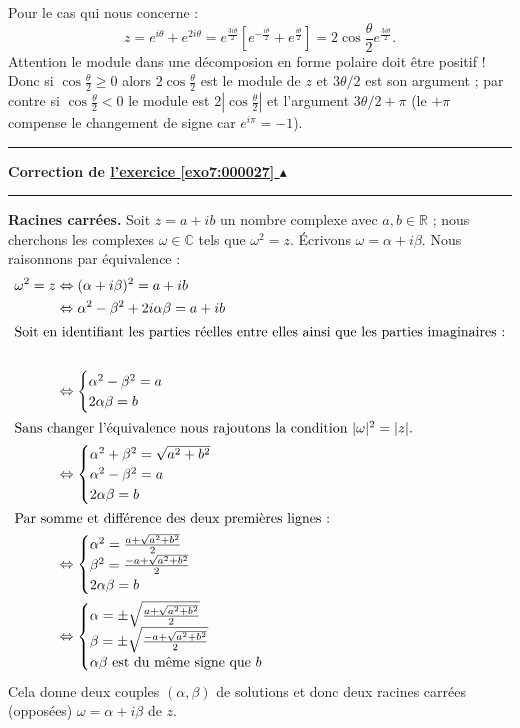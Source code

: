 \documentclass[11pt,a4paper]{article}
\newcommand{\Rr}{\mathbb{R}} \newcommand{\R}{\mathbb{R}}
\newcommand{\Cc}{\mathbb{C}} \newcommand{\C}{\mathbb{C}}
\newcounter{exo}
\newcommand{\correction}[1]{\hypertarget{cor7:#1}{}\label{cor7:#1}{\bf Correction de \hyperlink{exo7:#1}{l'exercice \ref{exo7:#1} $\blacktriangle$}}\vspace{1mm}\hrule\vspace{1mm}}
\newcommand{\fincorrection}{\vspace{1mm}\hrule\vspace*{7mm}}
\begin{document}
Pour le cas qui nous concerne :
$$z = e^{i\theta} + e^{2i\theta}
= e^{\frac{3i\theta}{2}} \left[ e^{-\frac{i\theta}{2}} +
e^{\frac{i\theta}{2}} \right] = 2\cos \frac{\theta}{2}
e^{\frac{3i\theta}{2}}.$$ Attention le module dans une
d\'ecomposion en forme polaire doit \^etre positif ! Donc si $\cos
\frac{\theta}{2}  \geq 0$  alors $2\cos\frac{\theta}{2}$ est le module de $z$
et $3\theta/2$ est son argument ; par contre si $\cos \frac{\theta}{2}  <
0$ le module est $2|\cos\frac{\theta}{2}|$ et l'argument $3\theta/2+\pi$ (le
$+\pi$ compense le changement de signe car $e^{i\pi} = -1$).
\fincorrection
\correction{000027}
\textbf{Racines carr\'ees.} Soit $z= a+ib$ un nombre complexe avec
$a,b \in \Rr$ ; nous cherchons les complexes $\omega \in \Cc$ tels
que $\omega^2 = z$. \'Ecrivons $\omega = \alpha + i \beta$. Nous
raisonnons par \'equivalence :
\begin{align*}
\omega^2 = z    & \Leftrightarrow (\alpha +i \beta)^2 = a+ib \\
        & \Leftrightarrow \alpha^2-\beta^2+2i\alpha\beta = a +i b \\
\intertext{Soit en identifiant les parties r\'eelles entre elles ainsi que les parties imaginaires :}\\
        & \Leftrightarrow
              \begin{cases}
                 \alpha^2-\beta^2 = a \\
                 2\alpha\beta = b
              \end{cases} \\
\intertext{Sans changer l'\'equivalence nous rajoutons la
condition $|\omega|^2 = |z|$.} & \Leftrightarrow
  \begin{cases}
     \alpha^2 + \beta^2 = \sqrt{a^2+b^2} \\
     \alpha^2-\beta^2 = a \\
     2\alpha\beta = b
  \end{cases} \\
\intertext{Par somme et différence des deux premières lignes :}
& \Leftrightarrow
  \begin{cases}
     \alpha^2  =\frac{a+ \sqrt{a^2+b^2}}{2} \\
     \beta^2 =  \frac{-a+ \sqrt{a^2+b^2}}{2} \\
     2\alpha\beta = b
  \end{cases} \\
& \Leftrightarrow
  \begin{cases}
     \alpha  =\pm \sqrt{\frac{a+ \sqrt{a^2+b^2}}{2}} \\
     \beta = \pm \sqrt{ \frac{-a+ \sqrt{a^2+b^2}}{2}} \\
     \alpha\beta \text{ est du m\^eme signe que } b
  \end{cases} \\
\end{align*}
Cela donne deux couples $(\alpha,\beta)$ de solutions et donc deux
racines carr\'ees (opposées) $\omega = \alpha + i\beta$ de $z$.
\end{document}
